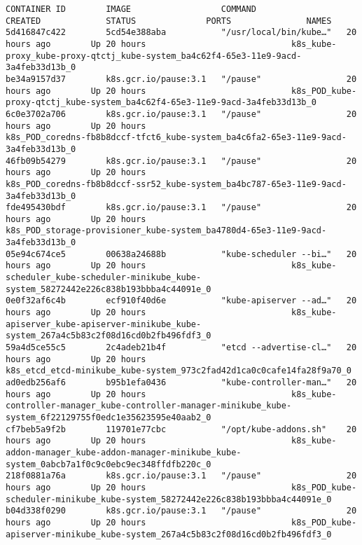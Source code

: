 \begin{lstlisting}
CONTAINER ID        IMAGE                  COMMAND                  CREATED             STATUS              PORTS               NAMES
5d416847c422        5cd54e388aba           "/usr/local/bin/kube…"   20 hours ago        Up 20 hours                             k8s_kube-proxy_kube-proxy-qtctj_kube-system_ba4c62f4-65e3-11e9-9acd-3a4feb33d13b_0
be34a9157d37        k8s.gcr.io/pause:3.1   "/pause"                 20 hours ago        Up 20 hours                             k8s_POD_kube-proxy-qtctj_kube-system_ba4c62f4-65e3-11e9-9acd-3a4feb33d13b_0
6c0e3702a706        k8s.gcr.io/pause:3.1   "/pause"                 20 hours ago        Up 20 hours                             k8s_POD_coredns-fb8b8dccf-tfct6_kube-system_ba4c6fa2-65e3-11e9-9acd-3a4feb33d13b_0
46fb09b54279        k8s.gcr.io/pause:3.1   "/pause"                 20 hours ago        Up 20 hours                             k8s_POD_coredns-fb8b8dccf-ssr52_kube-system_ba4bc787-65e3-11e9-9acd-3a4feb33d13b_0
fde495430bdf        k8s.gcr.io/pause:3.1   "/pause"                 20 hours ago        Up 20 hours                             k8s_POD_storage-provisioner_kube-system_ba4780d4-65e3-11e9-9acd-3a4feb33d13b_0
05e94c674ce5        00638a24688b           "kube-scheduler --bi…"   20 hours ago        Up 20 hours                             k8s_kube-scheduler_kube-scheduler-minikube_kube-system_58272442e226c838b193bbba4c44091e_0
0e0f32af6c4b        ecf910f40d6e           "kube-apiserver --ad…"   20 hours ago        Up 20 hours                             k8s_kube-apiserver_kube-apiserver-minikube_kube-system_267a4c5b83c2f08d16cd0b2fb496fdf3_0
59a4d5ce55c5        2c4adeb21b4f           "etcd --advertise-cl…"   20 hours ago        Up 20 hours                             k8s_etcd_etcd-minikube_kube-system_973c2fad42d1ca0c0cafe14fa28f9a70_0
ad0edb256af6        b95b1efa0436           "kube-controller-man…"   20 hours ago        Up 20 hours                             k8s_kube-controller-manager_kube-controller-manager-minikube_kube-system_6f22129755f0edc1e35623595e40aab2_0
cf7beb5a9f2b        119701e77cbc           "/opt/kube-addons.sh"    20 hours ago        Up 20 hours                             k8s_kube-addon-manager_kube-addon-manager-minikube_kube-system_0abcb7a1f0c9c0ebc9ec348ffdfb220c_0
218f0881a76a        k8s.gcr.io/pause:3.1   "/pause"                 20 hours ago        Up 20 hours                             k8s_POD_kube-scheduler-minikube_kube-system_58272442e226c838b193bbba4c44091e_0
b04d338f0290        k8s.gcr.io/pause:3.1   "/pause"                 20 hours ago        Up 20 hours                             k8s_POD_kube-apiserver-minikube_kube-system_267a4c5b83c2f08d16cd0b2fb496fdf3_0

\end{lstlisting}

